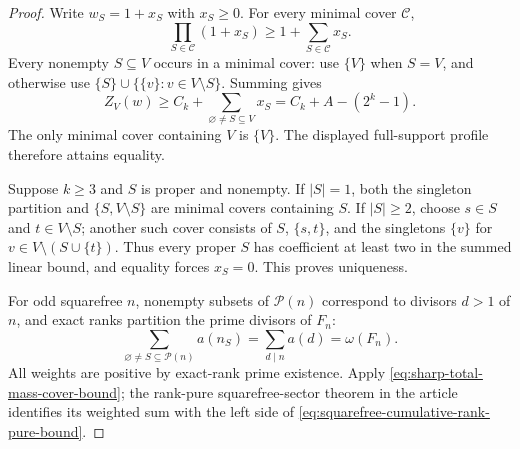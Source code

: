 \begin{proof}
Write $w_S=1+x_S$ with $x_S\geq0$.  For every minimal cover $\mathcal C$,
\[
 \prod_{S\in\mathcal C}(1+x_S)
 \geq1+\sum_{S\in\mathcal C}x_S.
\]
Every nonempty $S\subseteq V$ occurs in a minimal cover: use $\{V\}$ when
$S=V$, and otherwise use
$\{S\}\cup\{\{v\}:v\in V\setminus S\}$.  Summing gives
\[
 Z_V(w)\geq C_k+\sum_{\varnothing\ne S\subseteq V}x_S
 =C_k+A-(2^k-1).
\]
The only minimal cover containing $V$ is $\{V\}$.  The displayed
full-support profile therefore attains equality.

Suppose $k\geq3$ and $S$ is proper and nonempty.  If $|S|=1$, both the
singleton partition and $\{S,V\setminus S\}$ are minimal covers containing
$S$.  If $|S|\geq2$, choose $s\in S$ and $t\in V\setminus S$; another such
cover consists of $S$, $\{s,t\}$, and the singletons
$\{v\}$ for $v\in V\setminus(S\cup\{t\})$.  Thus every proper $S$ has
coefficient at least two in the summed linear bound, and equality forces
$x_S=0$.  This proves uniqueness.

For odd squarefree $n$, nonempty subsets of $\mathcal P(n)$ correspond to
divisors $d>1$ of $n$, and exact ranks partition the prime divisors of $F_n$:
\[
 \sum_{\varnothing\ne S\subseteq\mathcal P(n)}a(n_S)
 =\sum_{d\mid n}a(d)=\omega(F_n).
\]
All weights are positive by exact-rank prime existence.  Apply
\eqref{eq:sharp-total-mass-cover-bound}; the rank-pure squarefree-sector
theorem in the article identifies its weighted sum with the left side of
\eqref{eq:squarefree-cumulative-rank-pure-bound}.
\end{proof}
